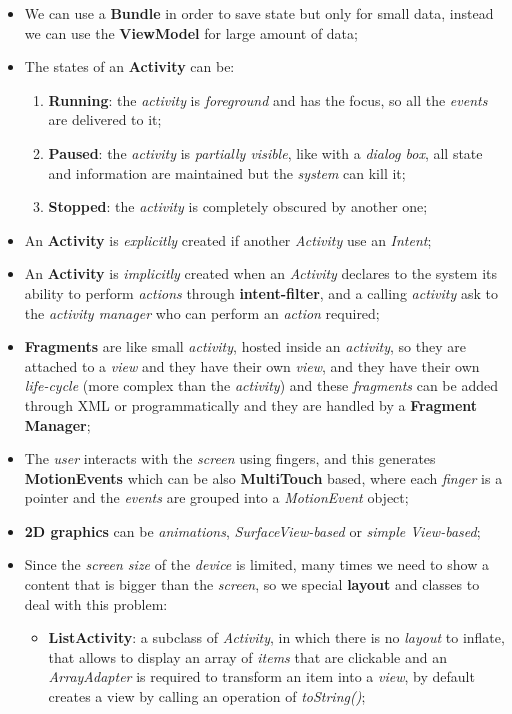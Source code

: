 \documentclass{article}
\begin{document}
\begin{itemize}
\begin{itemize}
\end{itemize}
\item We can use a \textbf{Bundle} in order to save state but only for small data, instead we can use the \textbf{ViewModel} for large amount of data;
\item The states of an \textbf{Activity} can be:
\begin{enumerate}
\item \textbf{Running}: the \emph{activity} is \emph{foreground} and has the focus, so all the \emph{events} are delivered to it;
\item \textbf{Paused}: the \emph{activity} is \emph{partially visible}, like with a \emph{dialog box}, all state and information are maintained but the \emph{system} can kill it;
\item \textbf{Stopped}: the \emph{activity} is completely obscured by another one;
\end{enumerate}
\item An \textbf{Activity} is \emph{explicitly} created if another \emph{Activity} use an \emph{Intent};
\item An \textbf{Activity} is \emph{implicitly} created when an \emph{Activity} declares to the system its ability to perform \emph{actions} through \textbf{intent-filter}, and a calling \emph{activity} ask to the \emph{activity manager} who can perform an \emph{action} required;
\item \textbf{Fragments} are like small \emph{activity}, hosted inside an \emph{activity}, so they are attached to a \emph{view} and they have their own \emph{view}, and they have their own \emph{life-cycle} (more complex than the \emph{activity}) and these \emph{fragments} can be added through XML or programmatically and they are handled by a \textbf{Fragment Manager};
\item The \emph{user} interacts with the \emph{screen} using fingers, and this generates \textbf{MotionEvents} which can be also \textbf{MultiTouch} based, where each \emph{finger} is a pointer and the \emph{events} are grouped into a \emph{MotionEvent} object;
\item \textbf{2D graphics} can be \emph{animations}, \emph{SurfaceView-based} or \emph{simple View-based};
\item Since the \emph{screen size} of the \emph{device} is limited, many times we need to show a content that is bigger than the \emph{screen}, so we special \textbf{layout} and classes to deal with this problem:
\begin{itemize}
\item \textbf{ListActivity}: a subclass of \emph{Activity}, in which there is no \emph{layout} to inflate, that allows to display an array of \emph{items} that are clickable and an \emph{ArrayAdapter} is required to transform an item into a \emph{view}, by default creates a view by calling an operation of \emph{toString()};

\end{itemize}
\end{itemize}
\end{document}

